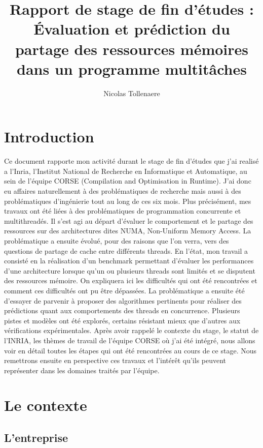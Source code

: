 \documentclass{report}
\author{Nicolas Tollenaere}
\title{Rapport de stage de fin d'études : Évaluation et prédiction du partage des ressources mémoires
dans un programme multitâches}
\begin{document}
\maketitle
\tableofcontents




\chapter{Introduction}
Ce document rapporte mon activité durant le stage de fin d'études que j'ai 
realisé a l'Inria, l'Institut National de Recherche en Informatique et
Automatique, au sein de l'équipe CORSE (Compilation and Optimisation in Runtime).
J'ai donc eu affaires naturellement à des problématiques de recherche mais aussi à
des problématiques d'ingénierie tout au long de ces six mois. Plus précisément, mes travaux ont été
liées à des problématiques de programmation concurrente et multithreadés. Il s'est agi au départ d'évaluer
le comportement et le partage des ressources sur des architectures dites NUMA, Non-Uniform Memory Access. 
La problématique a ensuite évolué, pour des raisons que l'on verra, vers des questions de partage de cache
entre différents threads.
En l'état, mon travail a consisté en la réalisation d'un benchmark permettant d'évaluer les performances
d'une architecture lorsque qu'un ou plusieurs threads sont limités et se disputent des ressources mémoire.
On expliquera ici les difficultés qui ont été rencontrées et comment ces difficultés ont pu être dépassées.
La problématique a ensuite été d'essayer de parvenir à proposer des algorithmes pertinents pour réaliser 
des prédictions quant aux comportements des threads en concurrence. 
Plusieurs pistes et modèles ont été explorés, certains résistant mieux que d'autres aux vérifications 
expérimentales.
Après avoir rappelé le contexte du stage, le statut de l'INRIA, les thèmes de travail de l'équipe CORSE où
j'ai été intégré, nous allons voir en détail toutes les étapes qui ont été rencontrées au cours de ce stage. 
Nous remettrons ensuite en perspective ces travaux et l'intérêt qu'ils peuvent représenter dans les 
domaines traités par l'équipe.

\chapter{Le contexte}
\section{L'entreprise}
\end{document}
